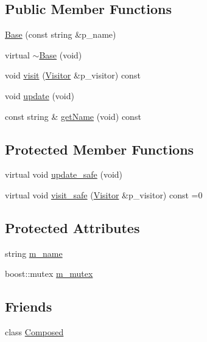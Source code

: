 \subsection*{Public Member Functions}
\begin{DoxyCompactItemize}
\item 
\hyperlink{classxtd_1_1counters_1_1Base_ab370a97f3a40bd529e871daedfce60c7}{Base} (const string \&p\+\_\+name)
\item 
virtual \hyperlink{classxtd_1_1counters_1_1Base_aa2bddc0c397ef1e77eff98969ba3bc7d}{$\sim$\+Base} (void)
\item 
void \hyperlink{classxtd_1_1counters_1_1Base_a0c743f0686dc24bada97c2ed31238c02}{visit} (\hyperlink{classxtd_1_1counters_1_1Visitor}{Visitor} \&p\+\_\+visitor) const 
\item 
void \hyperlink{classxtd_1_1counters_1_1Base_a5ba0d495403ba1ca4e1c6c30d8038dad}{update} (void)
\item 
const string \& \hyperlink{classxtd_1_1counters_1_1Base_a64ef0c0b30b420384494fd06c535f84d}{get\+Name} (void) const 
\end{DoxyCompactItemize}
\subsection*{Protected Member Functions}
\begin{DoxyCompactItemize}
\item 
virtual void \hyperlink{classxtd_1_1counters_1_1Base_a8b3d10c9fb2bea1d240f887bbe4008ea}{update\+\_\+safe} (void)
\item 
virtual void \hyperlink{classxtd_1_1counters_1_1Base_a0b8f3bdc6880dc03da750aa815dfdf0b}{visit\+\_\+safe} (\hyperlink{classxtd_1_1counters_1_1Visitor}{Visitor} \&p\+\_\+visitor) const =0
\end{DoxyCompactItemize}
\subsection*{Protected Attributes}
\begin{DoxyCompactItemize}
\item 
string \hyperlink{classxtd_1_1counters_1_1Base_ab07d4a6071bfa8263b24d5992bca6960}{m\+\_\+name}
\item 
boost\+::mutex \hyperlink{classxtd_1_1counters_1_1Base_aeeac2ffcae02eb6341418d708188a353}{m\+\_\+mutex}
\end{DoxyCompactItemize}
\subsection*{Friends}
\begin{DoxyCompactItemize}
\item 
class \hyperlink{classxtd_1_1counters_1_1Base_a93e934ad70d5b32b14beed5572450abf}{Composed}
\end{DoxyCompactItemize}


